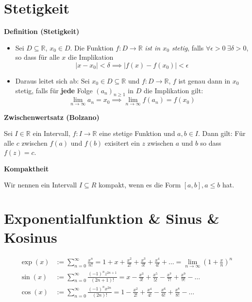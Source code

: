 \documentclass[25pt]{sciposter}
\newcommand{\limm}{\lim\limits_{n \to \infty}}
\newcommand{\R}{\mathbb{R}}
\newenvironment{method}[1]{\begin{mdframed}[backgroundcolor=blue!10,innertopmargin=15pt, innerbottommargin=15pt, nobreak=true]
		\textbf{#1 }
	}
	{ 
	\end{mdframed}
}
\begin{document}
\begin{multicols}{3}


\section*{Stetigkeit}
\begin{method}{Definition (Stetigkeit)}
	\begin{itemize}
		\item Sei $D \subseteq \mathbb{R}$, $x_0 \in D$. Die Funktion $f:D \to \R$ \textit{ist in $x_0$ stetig}, falls $\forall \epsilon > 0 \ \exists \delta > 0$, so dass für alle $x$ die Implikation $$|x-x_0| < \delta \implies |f(x) - f(x_0)| < \epsilon$$
		
		\item Daraus leitet sich ab: Sei $x_0 \in D \subseteq \R$ und $f:D \to \R$, $f$ ist genau dann in $x_0$ stetig, falls für \textbf{jede} Folge $(a_n)_{n \geq 1}$ in $D$ die Implikation gilt:$$\lim\limits_{n \to \infty} a_n = x_0 \implies \limm f(a_n) = f(x_0)$$
	\end{itemize}

\end{method}



\begin{method}{  Zwischenwertsatz (Bolzano)} 
	Sei $I \in \R$ ein Intervall, $f: I \to \R$ eine stetige Funktion und $a,b \in I$. Dann gilt: Für alle $c$ zwischen $f(a)$ und $f(b)$ exisitert ein $z$ zwischen $a$ und $b$ so dass $f(z) = c$.
\end{method}


\begin{method}{Kompaktheit}
	Wir nennen ein Intervall $I \subseteq R$ kompakt, wenn es die Form $[a,b], a \leq b$ hat.
\end{method}



\section*{Exponentialfunktion \& Sinus \& Kosinus}

\begin{align*}
	\operatorname{exp}(x) &:=\sum_{n=0}^{\infty} \frac{x^n}{n!} = 1 + x + \frac{x^2}{2!} + \frac{x^3}{3!} + \frac{x^4}{4!} +  \ldots = \lim_{n \to \infty} \left( 1 + \frac xn \right)^n\\
	\operatorname{sin}(x) &:=\sum_{n=0}^{\infty} \frac{(-1)^n z^{2n+1}}{(2n+1)!} = x - \frac{x^3}{3!}+ \frac{x^5}{5!} - \frac{x^7}{7!} +  \frac{x^9}{9!} - \ldots\\
	\operatorname{cos}(x) &:=\sum_{n=0}^{\infty} \frac{(-1)^n x^{2n}}{(2n)!} = 1 - \frac{x^2}{2!} + \frac{x^4}{4!} -\frac{x^6}{6!} + \frac{x^8}{8!} -\ldots 
\end{align*}


\end{multicols}
\end{document}
